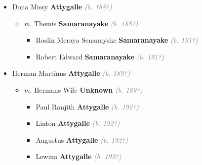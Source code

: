 \documentclass[10pt, openany]{book}
\begin{document}
\begin{itemize}
{\begin{itemize}
{\begin{itemize}
{\begin{itemize}
\item{Aileen Gamini \textbf{Attygalle} \textcolor{gray}{\textit{(b. 192?)}}
  }
\item{Chamini Kamala \textbf{Attygalle} \textcolor{gray}{\textit{(b. 192?)}}
  }
\item{Lakshmi ManelDe Alwis \textbf{Attygalle} \textcolor{gray}{\textit{(b. 193?)}}
   }
\item{Eiline Gladys Perera \textbf{Attygalle} \textcolor{gray}{\textit{(b. 193?)}}
   }
\end{itemize}}
\end{itemize}
   }
\item{Dona Missy \textbf{Attygalle} \textcolor{gray}{\textit{(b. 188?)}}
\begin{itemize}
\item{\textit{m.} Themis \textbf{Samaranayake} \textcolor{gray}{\textit{(b. 188?)}}   \label{couple:00000105:00000689} \begin{itemize}
\item{Roslin Meraya Senanayake \textbf{Samaranayake} \textcolor{gray}{\textit{(b. 191?)}}
   }
\item{Robert Edward \textbf{Samaranayake} \textcolor{gray}{\textit{(b. 191?)}}
  }
\end{itemize}}
\end{itemize}
  }
\item{Herman Martinus \textbf{Attygalle} \textcolor{gray}{\textit{(b. 189?)}}
\begin{itemize}
\item{\textit{m.} Hermans Wife \textbf{Unknown} \textcolor{gray}{\textit{(b. 189?)}}   \label{couple:00000107:00000882} \begin{itemize}
\item{Paul Ranjith \textbf{Attygalle} \textcolor{gray}{\textit{(b. 192?)}}
  }
\item{Linton \textbf{Attygalle} \textcolor{gray}{\textit{(b. 192?)}}
 }
\item{Augustus \textbf{Attygalle} \textcolor{gray}{\textit{(b. 192?)}}
 }
\item{Lewina \textbf{Attygalle} \textcolor{gray}{\textit{(b. 193?)}}
 }
\end{itemize}}
\end{itemize}
  }
\end{itemize}}
\end{itemize}
   
\end{document}
